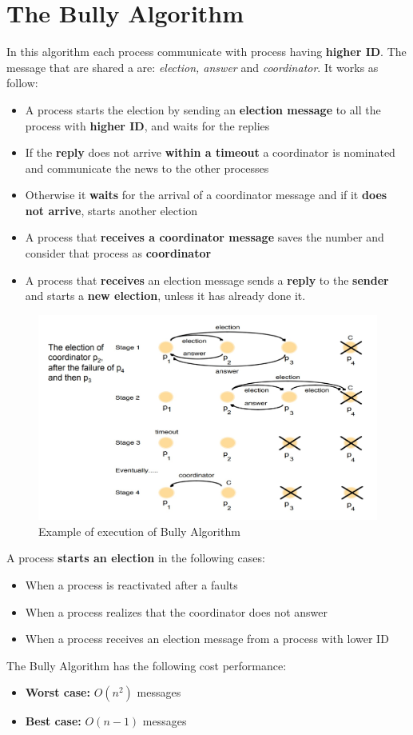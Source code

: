 \section{The Bully Algorithm}
In this algorithm each process communicate with process having \textbf{higher ID}. The message that are shared a are: \textit{election, answer} and \textit{coordinator}. It works as follow:
\begin{itemize}
    \item A process starts the election by sending an \textbf{election message} to all the process with \textbf{higher ID}, and waits for the replies
    \item If the \textbf{reply} does not arrive \textbf{within a timeout} a coordinator is nominated and communicate the news to the other processes
    \item Otherwise it \textbf{waits} for the arrival of a coordinator message and if it \textbf{does not arrive}, starts another election
    \item A process that \textbf{receives a coordinator message} saves the number and consider that process as \textbf{coordinator}
    \item A process that \textbf{receives} an election message sends a \textbf{reply} to the \textbf{sender} and starts a \textbf{new election}, unless it has already done it. 
\end{itemize}
\begin{figure}[!h]
    \centering
    \includegraphics[width=.9\linewidth]{images/SynchronizationCoordinationDS/bullyAlgorithm.jpeg}
    \caption{Example of execution of Bully Algorithm}
\end{figure}
A process \textbf{starts an election} in the following cases:
\begin{itemize}
    \item When a process is reactivated after a faults
    \item When a process realizes that the coordinator does not answer
    \item When a process receives an election message from a process with lower ID
\end{itemize}
The Bully Algorithm has the following cost performance:
\begin{itemize}
    \item \textbf{Worst case:} \(O(n^2)\) messages
    \item \textbf{Best case:} \(O(n - 1)\) messages
\end{itemize}


